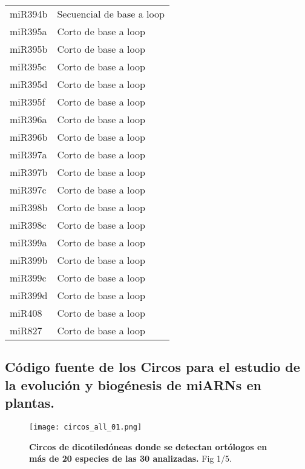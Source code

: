 \begin{table}[]
\begin{tabular}{ll}
miR394b        & Secuencial de base a loop \\
miR395a        & Corto de base a loop      \\
miR395b        & Corto de base a loop      \\
miR395c        & Corto de base a loop      \\
miR395d        & Corto de base a loop      \\
miR395f        & Corto de base a loop      \\
miR396a        & Corto de base a loop      \\
miR396b        & Corto de base a loop      \\
miR397a        & Corto de base a loop      \\
miR397b        & Corto de base a loop      \\
miR397c        & Corto de base a loop      \\
miR398b        & Corto de base a loop      \\
miR398c        & Corto de base a loop      \\
miR399a        & Corto de base a loop      \\
miR399b        & Corto de base a loop      \\
miR399c        & Corto de base a loop      \\
miR399d        & Corto de base a loop      \\
miR408         & Corto de base a loop      \\
miR827         & Corto de base a loop     
\end{tabular}
\end{table}


\subsection{Código fuente de los Circos para el estudio de la evolución y biogénesis de miARNs en plantas.}








\begin{landscape}
    \begin{figure}[htbp!] 
        \centering    
        \texttt{[image: circos\_all\_01.png]}
        \caption[Circos de dicotiledóneas (en más de 20 especies). 1/5]{
        \textbf{Circos de dicotiledóneas donde se detectan ortólogos en más de 20 especies de las 30 analizadas.}
        Fig 1/5.
        }
        \label{fig:circos_all_01}
    \end{figure}
\end{landscape}

